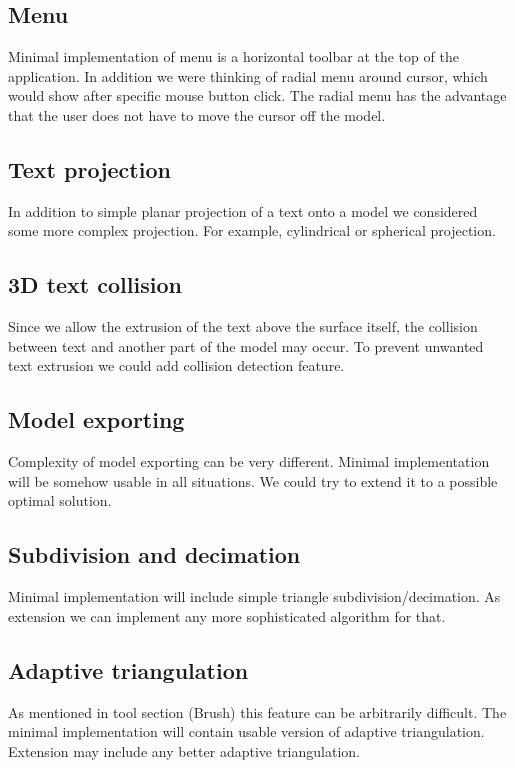 \subsection{Menu}

Minimal implementation of menu is a horizontal toolbar at the top of the application. In addition we were thinking of radial menu around cursor, which would show after specific mouse button click. The radial menu has the advantage that the user does not have to move the cursor off the model.


\subsection{Text projection}

In addition to simple planar projection of a text onto a model we considered some more complex projection. For example, cylindrical or spherical projection.


\subsection{3D text collision}

Since we allow the extrusion of the text above the surface itself, the collision between text and another part of the model may occur. To prevent unwanted text extrusion we could add collision detection feature.


\subsection{Model exporting}

Complexity of model exporting can be very different. Minimal implementation will be somehow usable in all situations. We could try to extend it to a possible optimal solution.


\subsection{Subdivision and decimation}

Minimal implementation will include simple triangle subdivision/decimation. As extension we can implement any more sophisticated algorithm for that.

\subsection{Adaptive triangulation}

As mentioned in tool section (Brush) this feature can be arbitrarily difficult. The minimal implementation will contain usable version of adaptive triangulation. Extension may include any better adaptive triangulation.


